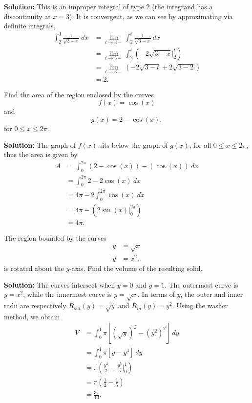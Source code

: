 \documentclass[11pt]{exam}
\begin{document}
\begin{questions}
\textbf{Solution:} This is an improper integral of type 2 (the integrand has a discontinuity at $x=3$). It is convergent, as we can see by approximating via definite integrals, 
\begin{align*}
\int_{2}^{3} \frac{1}{\sqrt{3-x}} \ dx & = \lim_{t \to 3-} \int_{2}^{t} \frac{1}{\sqrt{3-x}} \ dx \\ 
& = \lim_{t \to 3-} \int_{2}^{t} \left( -2\sqrt{3-x} \Big|_{2}^{t} \right) \\
& = \lim_{t \to 3-} (-2\sqrt{3-t}+2\sqrt{3-2})\\
& = 2.
\end{align*}

\newpage

\addpoints
\question[4] Find the area of the region enclosed by the curves 
\begin{equation*}
f(x)=\cos(x)
\end{equation*}
and 
\begin{equation*}
g(x)=2-\cos(x),
\end{equation*}
for $0 \leq x \leq 2\pi$. 

\textbf{Solution:} The graph of $f(x)$ sits below the graph of $g(x)$, for all $0 \leq x \leq 2\pi$, thus the area is given by 
\begin{align*}
A & = \int_{0}^{2\pi} (2-\cos(x)) - (\cos(x)) \ dx \\
& = \int_{0}^{2\pi} 2-2\cos(x) \ dx\\
& = 4\pi - 2\int_{0}^{2\pi} \cos(x) \ dx\\
& = 4\pi - \left( 2\sin(x) \Big|_{0}^{2\pi} \right) \\
& = 4\pi.
\end{align*}
\newpage
\addpoints

\question[4] The region bounded by the curves
\begin{align*}
y & =\sqrt{x}\\
y & =x^2,
\end{align*}
is rotated about the $y$-axis. Find the volume of the resulting solid.

\textbf{Solution:} The curves intersect when $y=0$ and $y=1$. The outermost curve is $y=x^2$, while the innermost curve is $y=\sqrt{x}$.  In terms of $y$, the outer and inner radii are respectively $R_{out}(y)=\sqrt{y}$ and $R_{in}(y)=y^2$. Using the washer method, we obtain 
\begin{align*}
V & = \int_{0}^{1} \pi[(\sqrt{y})^2-(y^2)^2] \ dy \\
& = \int_{0}^{1} \pi [y-y^4] \ dy\\
& = \pi\left(\frac{y^2}{2}-\frac{y^5}{5} \Big|_{0}^{1} \right)\\
& = \pi \left( \frac{1}{2}-\frac{1}{5}\right)\\
& =\frac{3\pi}{10}.
\end{align*}
\addpoints 
\newpage


\end{questions}
\end{document}
